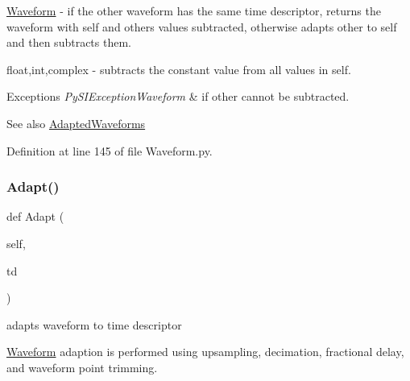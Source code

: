 \begin{DoxyItemize}
\item \hyperlink{classSignalIntegrity_1_1TimeDomain_1_1Waveform_1_1Waveform_1_1Waveform}{Waveform} -\/ if the other waveform has the same time descriptor, returns the waveform with self and others values subtracted, otherwise adapts other to self and then subtracts them.
\item float,int,complex -\/ subtracts the constant value from all values in self. 
\begin{DoxyExceptions}{Exceptions}
{\em Py\+S\+I\+Exception\+Waveform} & if other cannot be subtracted. \\
\hline
\end{DoxyExceptions}
\begin{DoxySeeAlso}{See also}
\hyperlink{namespaceSignalIntegrity_1_1TimeDomain_1_1Waveform_1_1AdaptedWaveforms}{Adapted\+Waveforms} 
\end{DoxySeeAlso}

\end{DoxyItemize}

Definition at line 145 of file Waveform.\+py.

\mbox{\label{classSignalIntegrity_1_1TimeDomain_1_1Waveform_1_1Waveform_1_1Waveform_af3655348c2535f82d246df872f0969e6}} 
\subsubsection{\texorpdfstring{Adapt()}{Adapt()}}
{\footnotesize\ttfamily def Adapt (\begin{DoxyParamCaption}\item[{}]{self,  }\item[{}]{td }\end{DoxyParamCaption})}



adapts waveform to time descriptor 

\hyperlink{classSignalIntegrity_1_1TimeDomain_1_1Waveform_1_1Waveform_1_1Waveform}{Waveform} adaption is performed using upsampling, decimation, fractional delay, and waveform point trimming.


